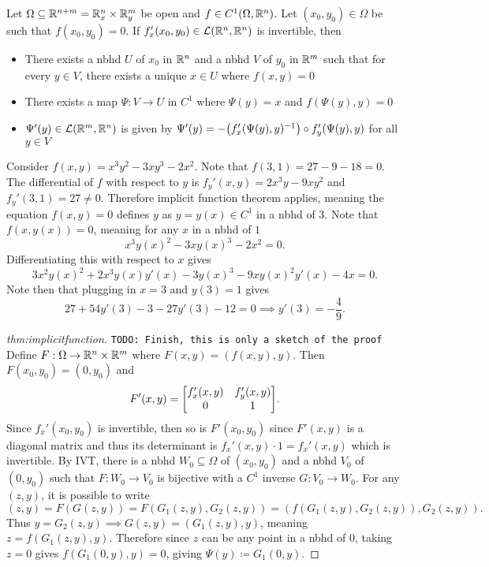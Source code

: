 \documentclass[../main.tex]{subfiles}
\begin{document}
\begin{theorem}
    \label{thm:implicitfunction}
    Let $\Omega \subseteq \mathbb{R}^{n + m} = \mathbb{R}_{x}^n \times \mathbb{R}_{y}^m$ be open and $f \in C^1(\Omega, \mathbb{R}^n)$. Let $(x_0, y_0) \in \Omega$ be such that $f(x_0, y_0) = 0$. If $f_x'(x_0,y_0) \in \mathcal{L}(\mathbb{R}^n, \mathbb{R}^n)$ is invertible, then 
    \begin{itemize}
        \item There exists a nbhd $U$ of $x_0$ in $\mathbb{R}^n$ and a nbhd $V$ of $y_0$ in $\mathbb{R}^m$ such that for every $y \in V$, there exists a unique $x \in U$ where $f(x, y) = 0$

        \item There exists a map $\Psi : V \to U$ in $C^1$ where $\Psi(y) = x$ and $f(\Psi(y), y) = 0$

        \item $\Psi'(y) \in \mathcal{L}(\mathbb{R}^m, \mathbb{R}^n)$ is given by $\Psi'(y) = -\qty(f_x'(\Psi(y),y)^{-1}) \circ f_y'(\Psi(y), y)$ for all $y \in V$
    \end{itemize}
\end{theorem}

\begin{example}
    Consider $f(x,y) = x^3 y^2 - 3xy^3 - 2x^2$. Note that $f(3,1) = 27 - 9 - 18 = 0$. The differential of $f$ with respect to $y$ is $f_y'(x,y) = 2x^3 y - 9xy^2$ and $f_y'(3,1) = 27 \neq 0$. Therefore implicit function theorem applies, meaning the equation $f(x,y) = 0$ defines $y$ as $y = y(x) \in C^1$ in a nbhd of $3$. Note that $f(x, y(x)) = 0$, meaning for any $x$ in a nbhd of $1$
    \[
        x^3 y(x)^2 - 3x y(x)^3 - 2x^2 = 0
    .\]
    Differentiating this with respect to $x$ gives
    \[
        3x^2 y(x)^2 + 2x^3 y(x) y'(x) - 3y(x)^3 - 9x y(x)^2 y'(x) - 4x = 0
    .\]
    Note then that plugging in $x = 3$ and $y(3) = 1$ gives
    \[
        27 + 54 y'(3) - 3 - 27 y'(3) - 12 = 0 \implies y'(3) = -\frac{4}{9}
    .\]
\end{example}

\begin{proof}[thm:implicitfunction]
    \verb|TODO: Finish, this is only a sketch of the proof| \\

    Define $F : \Omega \to \mathbb{R}^n \times \mathbb{R}^m$ where $F(x,y) = (f(x,y), y)$. Then $F(x_0, y_0) = (0, y_0)$ and 
    \[
        F'(x,y) = \mqty[
        f_x'(x,y) & f_y'(x,y) \\
        0         & 1
        ]
    .\]
    Since $f_x'(x_0, y_0)$ is invertible, then so is $F'(x_0, y_0)$ since $F'(x,y)$ is a diagonal matrix and thus its determinant is $f_x'(x,y) \cdot 1 = f_x'(x,y)$ which is invertible. By IVT, there is a nbhd $W_0 \subseteq \Omega$ of $(x_0, y_0)$ and a nbhd $V_0$ of $(0, y_0)$ such that $F : W_0 \to V_0$ is bijective with a $C^1$ inverse $G : V_0 \to W_0$. For any $(z,y)$, it is possible to write 
    \[
        (z,y) = F(G(z,y)) = F(G_1(z,y), G_2(z,y)) = (f(G_1(z,y), G_2(z,y)), G_2(z,y))
    .\]
    Thus $y = G_2(z,y) \implies G(z,y) = (G_1(z,y), y)$, meaning $z = f(G_1(z,y), y)$. Therefore since $z$ can be any point in a nbhd of $0$, taking $z = 0$ gives $f(G_1(0,y),y ) = 0$, giving $\Psi(y) \coloneq G_1(0,y)$.
\end{proof}
\end{document}
